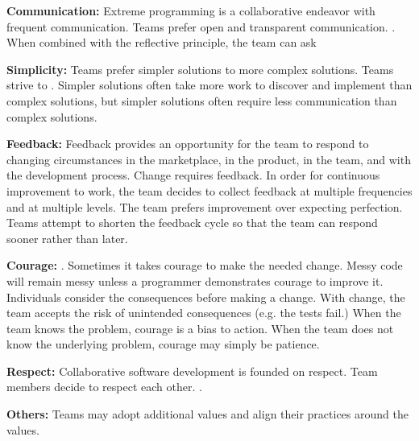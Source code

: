 \textbf{Communication:} Extreme programming is a collaborative endeavor with frequent communication. Teams prefer open and transparent communication. 
 \cite{BeckExtremeProgramming2004}. When combined with the reflective principle, the team can ask  \cite{BeckExtremeProgramming2004}


\textbf{Simplicity:} Teams prefer simpler solutions to more complex solutions. Teams strive to  \cite{BeckExtremeProgramming2004}. Simpler solutions often take more work to discover and implement than complex solutions, but simpler solutions often require less communication than complex solutions.










\textbf{Feedback:} Feedback provides an opportunity for the team to respond to changing circumstances in the marketplace, in the product, in the team, and with the development process. Change requires feedback. In order for continuous improvement to work, the team decides to collect feedback at multiple frequencies and at multiple levels. The team prefers improvement over expecting perfection. Teams attempt to shorten the feedback cycle so that the team can respond sooner rather than later.


\textbf{Courage:}    \cite{BeckExtremeProgramming2004}. Sometimes it takes courage to make the needed change. Messy code will remain messy unless a programmer demonstrates courage to improve it. Individuals consider the consequences before making a change. With change, the team accepts the risk of unintended consequences (e.g. the tests fail.) When the team knows the problem, courage is a bias to action. When the team does not know the underlying problem, courage may simply be patience. 


\textbf{Respect:} Collaborative software development is founded on respect. Team members decide to respect each other.  \cite{BeckExtremeProgramming2004}.


\textbf{Others:} Teams may adopt additional values and align their practices around the values. 


